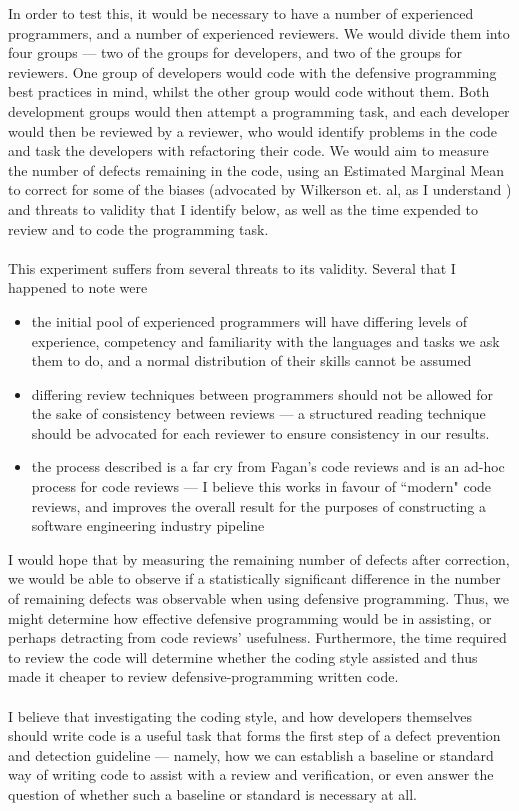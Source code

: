In order to test this, it would be necessary to have a number of experienced programmers, and a
number of experienced reviewers.
We would divide them into four groups --- two of the groups for developers, and two of the groups
for reviewers.
One group of developers would code with the defensive programming best practices in mind, whilst the
other group would code without them.
Both development groups would then attempt a programming task, and each developer would then be
reviewed by a reviewer, who would identify problems in the code and task the developers with
refactoring their code.
We would aim to measure the number of defects remaining in the code, using an Estimated Marginal
Mean \cite{searle1980population} to correct for some of the biases (advocated by Wilkerson et. al, as I
understand \cite{wilkerson2012comparing}) and threats to validity that I identify
below, as well as the time expended to review and to code the programming task.\\
\\
This experiment suffers from several threats to its validity.
Several that I happened to note were
\begin{itemize}
	\item the initial pool of experienced programmers will have differing levels of experience,
		competency and familiarity with the languages and tasks we ask them to do, and a normal
		distribution of their skills cannot be assumed
	\item differing review techniques between programmers should not be allowed for the sake of
		consistency between reviews --- a structured reading technique should be advocated for each
		reviewer to ensure consistency in our results.
	\item the process described is a far cry from Fagan's code reviews and is an ad-hoc process for
		code reviews --- I believe this works in favour of ``modern" code reviews, and improves the
		overall result for the purposes of constructing a software engineering industry pipeline
\end{itemize}

I would hope that by measuring the remaining number of defects after correction, we would be able to
observe if a statistically significant difference in the number of remaining defects was observable
when using defensive programming.
Thus, we might determine how effective defensive programming would be in assisting, or perhaps detracting from code reviews' usefulness.
Furthermore, the time required to review the code will determine whether the coding style assisted
and thus made it cheaper to review defensive-programming written code.\\
\\
I believe that investigating the coding style, and how developers themselves should write code is a
useful task that forms the first step of a defect prevention and detection guideline --- namely, how
we can establish a baseline or standard way of writing code to assist with a review and
verification, or even answer the question of whether such a baseline or standard is necessary at
all.

